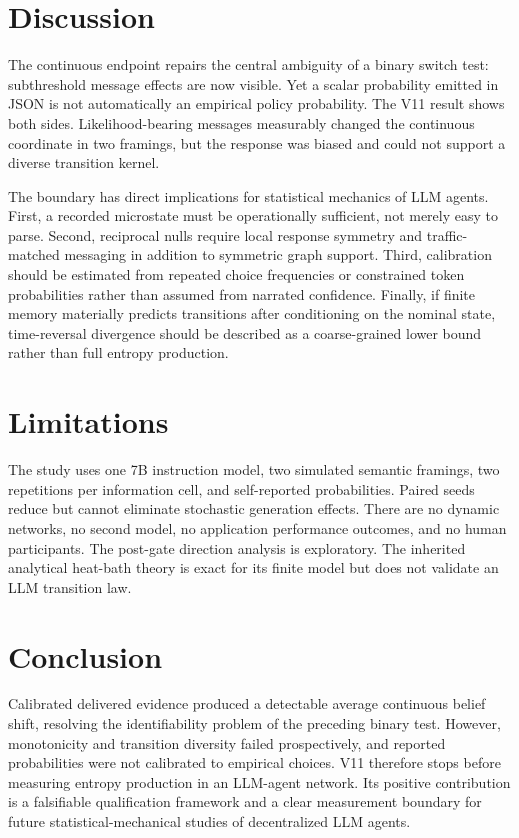 \documentclass[12pt]{article}
\begin{document}
\section{Discussion}

The continuous endpoint repairs the central ambiguity of a binary switch test:
subthreshold message effects are now visible.  Yet a scalar probability emitted
in JSON is not automatically an empirical policy probability.  The V11 result
shows both sides.  Likelihood-bearing messages measurably changed the continuous
coordinate in two framings, but the response was biased and could not support a
diverse transition kernel.

The boundary has direct implications for statistical mechanics of LLM agents.
First, a recorded microstate must be operationally sufficient, not merely easy
to parse.  Second, reciprocal nulls require local response symmetry and
traffic-matched messaging in addition to symmetric graph support.  Third,
calibration should be estimated from repeated choice frequencies or constrained
token probabilities rather than assumed from narrated confidence.  Finally,
if finite memory materially predicts transitions after conditioning on the
nominal state, time-reversal divergence should be described as a coarse-grained
lower bound rather than full entropy production.

\section{Limitations}

The study uses one 7B instruction model, two simulated semantic framings, two
repetitions per information cell, and self-reported probabilities.  Paired
seeds reduce but cannot eliminate stochastic generation effects.  There are no
dynamic networks, no second model, no application performance outcomes, and no
human participants.  The post-gate direction analysis is exploratory.  The
inherited analytical heat-bath theory is exact for its finite model but does
not validate an LLM transition law.

\section{Conclusion}

Calibrated delivered evidence produced a detectable average continuous belief
shift, resolving the identifiability problem of the preceding binary test.
However, monotonicity and transition diversity failed prospectively, and
reported probabilities were not calibrated to empirical choices.  V11
therefore stops before measuring entropy production in an LLM-agent network.
Its positive contribution is a falsifiable qualification framework and a clear
measurement boundary for future statistical-mechanical studies of decentralized
LLM agents.
\end{document}
